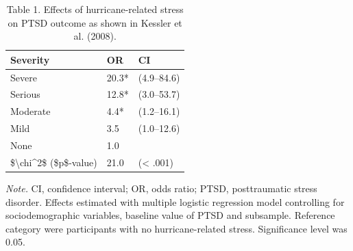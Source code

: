 \documentclass[
]{krantz}
\begin{document}
\begin{table}

\caption{\label{tab:tabResults}Table 1. Effects of hurricane-related stress on PTSD outcome as shown in Kessler et al. (2008).}
\centering
\begin{tabular}[t]{l|l|l}
\hline
Severity & OR & CI\\
\hline
Severe & 20.3* & (4.9–84.6)\\
\hline
Serious & 12.8* & (3.0–53.7)\\
\hline
Moderate & 4.4* & (1.2–16.1)\\
\hline
Mild & 3.5 & (1.0–12.6)\\
\hline
None & 1.0 & \\
\hline
\$\textbackslash{}chi\textasciicircum{}2\$ (\$p\$-value) & 21.0 & (< .001)\\
\hline
\end{tabular}
\end{table}

\emph{Note.} CI, confidence interval; OR, odds ratio; PTSD, posttraumatic stress disorder. Effects estimated with multiple logistic regression model controlling for sociodemographic variables, baseline value of PTSD and subsample. Reference category were participants with no hurricane-related stress. Significance level was 0.05.
\end{document}
